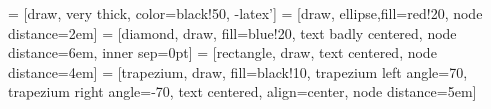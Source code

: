 = [draw, very thick, color=black!50, -latex']
 = [draw, ellipse,fill=red!20, node distance=2em]
 = [diamond, draw, fill=blue!20,
    text badly centered, node distance=6em, inner sep=0pt]
 = [rectangle, draw, %
    text centered, node distance=4em]
 = [trapezium, draw, fill=black!10, %
    trapezium left angle=70, trapezium right angle=-70,
    text centered, align=center, node distance=5em]


\DeclareRobustCommand\suppOrApp{%
  \ifthenelse{\boolean{thesisStyle}}%
    {Appendix}
    {Supplementary}
}
\DeclareRobustCommand\Fig{%
  \ifthenelse{\boolean{thesisStyle}}%
    {Figure}%
    {Fig.}%
}




{}




\def\D{\mathrm{d}}

\newcommand{\ANDw}{\land}
\newcommand{\ORw}{\lor}


\newcommand{\introSameGeneCredit}{%
\ifthenelse{\boolean{thesisStyle}}{%
  \footnote{This chapter is taken from material in \citealt{Shestov2013a}.
Brandon Barker is the primary author of all material found herein.}%
}%
{}%
}



\newcommand{\epiSameGeneCredit}{%
\ifthenelse{\boolean{thesisStyle}}{%
  \footnote{This chapter is published as \citet{Xu2012}.
Brandon Barker and Lin Xu contributed equally to this work.
It is additionally available in \citet[chapter 4]{Xu2012a}.}%
}%
{}%
}

